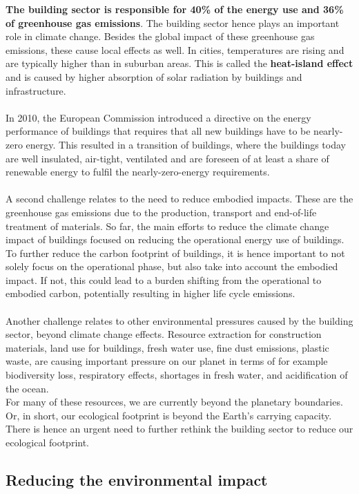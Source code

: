 \documentclass[../summary.tex]{subfiles}
\begin{document}
	\textbf{The building sector is responsible for 40\% of the energy use and 36\% of greenhouse gas emissions}. The building sector hence plays an important role in climate change. Besides the global impact of these greenhouse gas emissions, these cause local effects as well. In cities, temperatures are rising and are typically higher than in suburban areas. This is called the \textbf{heat-island effect} and is caused by higher absorption of solar radiation by buildings and infrastructure.
	\\\\
	In 2010, the European Commission introduced a directive on the energy performance of buildings that requires that all new buildings have to be nearly-zero energy. This resulted in a transition of buildings, where the buildings today are well insulated, air-tight, ventilated and are foreseen of at least a share of renewable energy to fulfil the nearly-zero-energy requirements.
	\\\\
	A second challenge relates to the need to reduce embodied impacts. These are the greenhouse gas emissions due to the production, transport and end-of-life treatment of materials. So far, the main efforts to reduce the climate change impact of buildings focused on reducing the operational energy use of buildings. To further reduce the carbon footprint of buildings, it is hence important to not solely focus on the operational phase, but also take into account the embodied impact. If not, this could lead to a burden shifting from the operational to embodied carbon, potentially resulting in higher life cycle emissions.
	\\\\
	Another challenge relates to other environmental pressures caused by the building sector, beyond climate change effects. Resource extraction for construction materials, land use for buildings, fresh water use, fine dust emissions, plastic waste, are causing important pressure on our planet in terms of for example biodiversity loss, respiratory effects, shortages in fresh water, and acidification of the ocean. 
	\\
	For many of these resources, we are currently beyond the planetary boundaries. Or, in short, our ecological footprint is beyond the Earth’s carrying capacity. There is hence an urgent need to further rethink the building sector to reduce our ecological footprint. 
	
	\subsection{Reducing the environmental impact}
	
\end{document}
